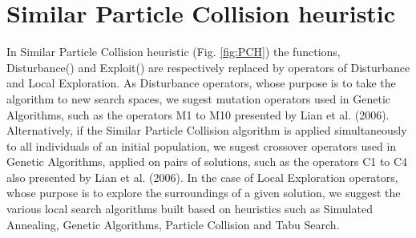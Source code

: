 \section{Similar Particle Collision heuristic}
\label{sec:SPC}

In Similar Particle Collision heuristic (Fig. \ref{fig:PCH}) the functions, Disturbance() and Exploit() are respectively replaced by operators of Disturbance and Local Exploration. As Disturbance operators, whose purpose is to take the algorithm to new search spaces, we sugest mutation operators used in Genetic Algorithms, such as the operators M1 to M10 presented by Lian et al. (2006). Alternatively, if the Similar Particle Collision algorithm is applied simultaneously to all individuals of an initial population, we sugest crossover operators used in Genetic Algorithms, applied on pairs of solutions, such as the operators C1 to C4 also presented by Lian et al. (2006). In the case of Local Exploration operators, whose purpose is to explore the surroundings of a given solution, we suggest the various local search algorithms built based on heuristics such as Simulated Annealing, Genetic Algorithms, Particle Collision and Tabu Search. \\

